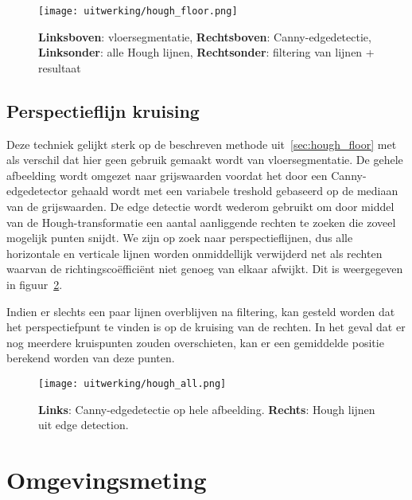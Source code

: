 \begin{figure}
    \texttt{[image: uitwerking/hough\_floor.png]}
    \caption{\textbf{Linksboven}: vloersegmentatie, \textbf{Rechtsboven}: Canny-edgedetectie, \textbf{Linksonder}: alle Hough lijnen, \textbf{Rechtsonder}: filtering van lijnen + resultaat}
    \label{fig:hough_floor}
\end{figure}


\subsection{Perspectieflijn kruising}\label{sec:perspectieflijnkruising}
Deze techniek gelijkt sterk op de beschreven methode uit~\ref{sec:hough_floor} met als verschil dat hier geen gebruik gemaakt wordt van vloersegmentatie.
De gehele afbeelding wordt omgezet naar grijswaarden voordat het door een Canny-edgedetector gehaald wordt met een variabele treshold gebaseerd op de mediaan van de grijswaarden.
De edge detectie wordt wederom gebruikt om door middel van de Hough-transformatie een aantal aanliggende rechten te zoeken die zoveel mogelijk punten snijdt.
We zijn op zoek naar perspectieflijnen, dus alle horizontale en verticale lijnen worden onmiddellijk verwijderd net als rechten waarvan de richtingsco\"{e}ffici\"{e}nt
niet genoeg van elkaar afwijkt. Dit is weergegeven in figuur~\ref{fig:hough_all}.

Indien er slechts een paar lijnen overblijven na filtering, kan gesteld worden dat het perspectiefpunt te vinden is op de kruising van de rechten.
In het geval dat er nog meerdere kruispunten zouden overschieten, kan er een gemiddelde positie berekend worden van deze punten.

\begin{figure}
    \texttt{[image: uitwerking/hough\_all.png]}
    \caption{\textbf{Links}: Canny-edgedetectie op hele afbeelding. \textbf{Rechts}: Hough lijnen uit edge detection.}
    \label{fig:hough_all}
\end{figure}


\section{Omgevingsmeting} \label{sec:omgevingsmeting}

